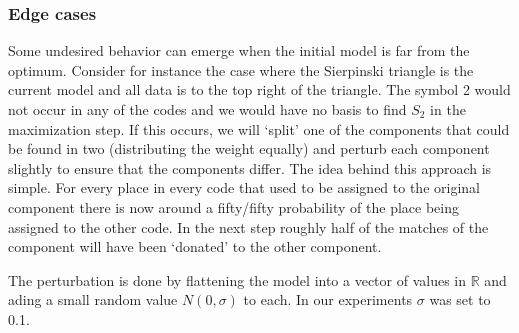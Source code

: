 \documentclass[10pt]{article}
\theoremstyle{definition}
\begin{document}
\subsubsection{Edge cases}

Some undesired behavior can emerge when the initial model is far from the optimum. Consider for instance the case where the Sierpinski triangle is the current model and all data is to the top right of the triangle. The symbol 2 would not occur in any of the codes and we would have no basis to find $S_2$ in the maximization step. If this occurs, we will `split' one of the components that could be found in two (distributing the weight equally) and perturb each component slightly to ensure that the components differ. The idea behind this approach is simple. For every place in every code that used to be assigned to the original component there is now around a fifty/fifty probability of the place being assigned to the other code. In the next step roughly half of the matches of the component will have been `donated' to the other component.

The perturbation is done by flattening the model into a vector of values in ${\mathbb R}$ and ading a small random value $N(0, \sigma)$ to each. In our experiments $\sigma$ was set to 0.1.





\end{document}
